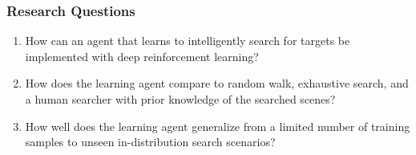 \begin{frame}
    \frametitle{Research Questions}
    \begin{enumerate}
        \item How can an agent that learns to intelligently search for targets be implemented with deep reinforcement learning?
        \item How does the learning agent compare to random walk, exhaustive search, and a human searcher with prior knowledge of the searched scenes?
        \item How well does the learning agent generalize from a limited number of training samples to unseen in-distribution search scenarios?
    \end{enumerate}    
\end{frame}